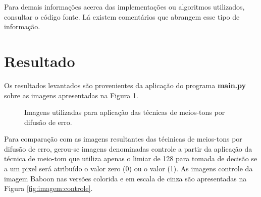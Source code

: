 \documentclass{article}
\begin{document}
Para demais informações acerca das implementações ou algoritmos utilizados, consultar o código fonte. Lá existem comentários que abrangem esse tipo de informação.

%
\section{Resultado}
Os resultados levantados são provenientes da aplicação do programa \textbf{main.py} sobre as imagens apresentadas na Figura \ref{fig:imagem:entrada}. 

\begin{figure}[!htp]%
	\centering
	\qquad
	\caption{Imagens utilizadas para aplicação das técnicas de meios-tons por difusão de erro.}%
	\label{fig:imagem:entrada}%
\end{figure}

Para comparação com as imagens resultantes das técinicas de meios-tons por difusão de erro, gerou-se imagens denominadas controle a partir da aplicação da técnica de meio-tom que utiliza apenas o limiar de 128 para tomada de decisão se a um pixel será atribuído o valor zero (0) ou o valor (1). As imagens controle da imagem Baboon nas versões colorida e em escala de cinza são apresentadas na Figura \ref{fig:imagem:controle}.
\end{document}
